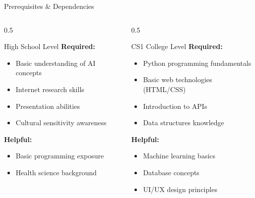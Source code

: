 \documentclass[aspectratio=169]{beamer}
\begin{document}
\begin{frame}{Prerequisites \& Dependencies}
    \begin{columns}[t]
        \begin{column}{0.5\textwidth}
            \begin{block}{High School Level}
                \textbf{Required:}
                \begin{itemize}
                    \item Basic understanding of AI concepts
                    \item Internet research skills
                    \item Presentation abilities
                    \item Cultural sensitivity awareness
                \end{itemize}
                
                \textbf{Helpful:}
                \begin{itemize}
                    \item Basic programming exposure
                    \item Health science background
                \end{itemize}
            \end{block}
        \end{column}
        \begin{column}{0.5\textwidth}
            \begin{block}{CS1 College Level}
                \textbf{Required:}
                \begin{itemize}
                    \item Python programming fundamentals
                    \item Basic web technologies (HTML/CSS)
                    \item Introduction to APIs
                    \item Data structures knowledge
                \end{itemize}
                
                \textbf{Helpful:}
                \begin{itemize}
                    \item Machine learning basics
                    \item Database concepts
                    \item UI/UX design principles
                \end{itemize}
            \end{block}
        \end{column}
    \end{columns}
\end{frame}
\end{document}

